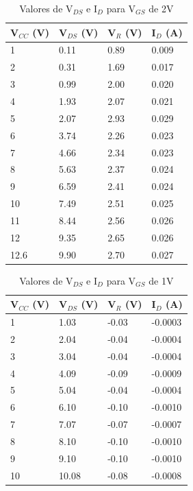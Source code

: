 \documentclass{article}
\begin{document}
\begin{table}[h!]
    \centering
    \begin{tabular}{|l|l|l|l|}
    \hline
        V$_{CC}$ (V) & V$_{DS}$ (V) & V$_{R}$ (V) & I$_{D}$ (A) \\ \hline
        1 & 0.11 & 0.89 & 0.009 \\ \hline
        2 & 0.31 & 1.69 & 0.017 \\ \hline
        3 & 0.99 & 2.00 & 0.020 \\ \hline
        4 & 1.93 & 2.07 & 0.021 \\ \hline
        5 & 2.07 & 2.93 & 0.029 \\ \hline
        6 & 3.74 & 2.26 & 0.023 \\ \hline
        7 & 4.66 & 2.34 & 0.023 \\ \hline
        8 & 5.63 & 2.37 & 0.024 \\ \hline
        9 & 6.59 & 2.41 & 0.024 \\ \hline
        10 & 7.49 & 2.51 & 0.025 \\ \hline
        11 & 8.44 & 2.56 & 0.026 \\ \hline
        12 & 9.35 & 2.65 & 0.026 \\ \hline
        12.6 & 9.90 & 2.70 & 0.027 \\ \hline
    \end{tabular}
    \caption{Valores de V$_{DS}$ e I$_D$ para V$_{GS}$ de 2V}
    \label{table: 1}
\end{table}

\begin{table}[h!]
    \centering
    \begin{tabular}{|l|l|l|l|}
    \hline
        V$_{CC}$ (V) & V$_{DS}$ (V) & V$_{R}$ (V) & I$_{D}$ (A) \\ \hline
        1 & 1.03 & -0.03 & -0.0003 \\ \hline
        2 & 2.04 & -0.04 & -0.0004 \\ \hline
        3 & 3.04 & -0.04 & -0.0004 \\ \hline
        4 & 4.09 & -0.09 & -0.0009 \\ \hline
        5 & 5.04 & -0.04 & -0.0004 \\ \hline
        6 & 6.10 & -0.10 & -0.0010 \\ \hline
        7 & 7.07 & -0.07 & -0.0007 \\ \hline
        8 & 8.10 & -0.10 & -0.0010 \\ \hline
        9 & 9.10 & -0.10 & -0.0010 \\ \hline
        10 & 10.08 & -0.08 & -0.0008 \\ \hline
    \end{tabular}
    \caption{Valores de V$_{DS}$ e I$_D$ para V$_{GS}$ de 1V}
    \label{table: 2}
\end{table}
\end{document}
